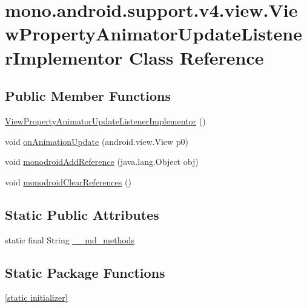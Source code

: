 \hypertarget{classmono_1_1android_1_1support_1_1v4_1_1view_1_1_view_property_animator_update_listener_implementor}{
\section{mono.android.support.v4.view.ViewPropertyAnimatorUpdateListenerImplementor Class Reference}
\label{classmono_1_1android_1_1support_1_1v4_1_1view_1_1_view_property_animator_update_listener_implementor}
}
\subsection*{Public Member Functions}
\begin{CompactItemize}
\item 
\hyperlink{classmono_1_1android_1_1support_1_1v4_1_1view_1_1_view_property_animator_update_listener_implementor_39756d2d42f6d0bf89e519f0be482240}{ViewPropertyAnimatorUpdateListenerImplementor} ()
\item 
void \hyperlink{classmono_1_1android_1_1support_1_1v4_1_1view_1_1_view_property_animator_update_listener_implementor_4d255e7a411646970a62e3fda262fc90}{onAnimationUpdate} (android.view.View p0)
\item 
void \hyperlink{classmono_1_1android_1_1support_1_1v4_1_1view_1_1_view_property_animator_update_listener_implementor_ab23a713316535ff467814de0a1d96b1}{monodroidAddReference} (java.lang.Object obj)
\item 
void \hyperlink{classmono_1_1android_1_1support_1_1v4_1_1view_1_1_view_property_animator_update_listener_implementor_0279030b5e11e7f78669ad7a2a033d8b}{monodroidClearReferences} ()
\end{CompactItemize}
\subsection*{Static Public Attributes}
\begin{CompactItemize}
\item 
static final String \hyperlink{classmono_1_1android_1_1support_1_1v4_1_1view_1_1_view_property_animator_update_listener_implementor_f516b0230225633ea96b66269a4242c3}{\_\-\_\-md\_\-methods}
\end{CompactItemize}
\subsection*{Static Package Functions}
\begin{CompactItemize}
\item 
\hyperlink{classmono_1_1android_1_1support_1_1v4_1_1view_1_1_view_property_animator_update_listener_implementor_281f35e3e8a45152fd4ae24a30e7bc3c}{\mbox{[}static initializer\mbox{]}}
\end{CompactItemize}
